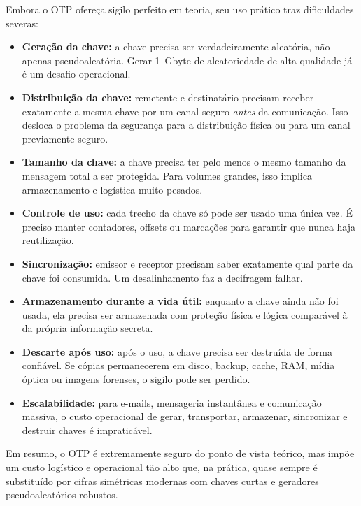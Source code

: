 \documentclass[12pt,a4paper]{article}
\newenvironment{resposta}{%
    \begin{respostabox}
    \color{red!70!black}\sloppy
}{%
    \end{respostabox}
}
\begin{document}
\begin{resposta}

Embora o OTP ofereça sigilo perfeito em teoria, seu uso prático traz dificuldades severas:

\begin{itemize}
    \item \textbf{Geração da chave:} a chave precisa ser verdadeiramente aleatória, não apenas pseudoaleatória. Gerar 1~Gbyte de aleatoriedade de alta qualidade já é um desafio operacional.
    \item \textbf{Distribuição da chave:} remetente e destinatário precisam receber exatamente a mesma chave por um canal seguro \emph{antes} da comunicação. Isso desloca o problema da segurança para a distribuição física ou para um canal previamente seguro.
    \item \textbf{Tamanho da chave:} a chave precisa ter pelo menos o mesmo tamanho da mensagem total a ser protegida. Para volumes grandes, isso implica armazenamento e logística muito pesados.
    \item \textbf{Controle de uso:} cada trecho da chave só pode ser usado uma única vez. É preciso manter contadores, offsets ou marcações para garantir que nunca haja reutilização.
    \item \textbf{Sincronização:} emissor e receptor precisam saber exatamente qual parte da chave foi consumida. Um desalinhamento faz a decifragem falhar.
    \item \textbf{Armazenamento durante a vida útil:} enquanto a chave ainda não foi usada, ela precisa ser armazenada com proteção física e lógica comparável à da própria informação secreta.
    \item \textbf{Descarte após uso:} após o uso, a chave precisa ser destruída de forma confiável. Se cópias permanecerem em disco, backup, cache, RAM, mídia óptica ou imagens forenses, o sigilo pode ser perdido.
    \item \textbf{Escalabilidade:} para e-mails, mensageria instantânea e comunicação massiva, o custo operacional de gerar, transportar, armazenar, sincronizar e destruir chaves é impraticável.
\end{itemize}

Em resumo, o OTP é extremamente seguro do ponto de vista teórico, mas impõe um custo logístico e operacional tão alto que, na prática, quase sempre é substituído por cifras simétricas modernas com chaves curtas e geradores pseudoaleatórios robustos.
\end{resposta}
\end{document}
